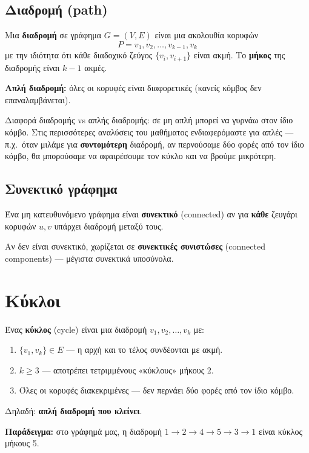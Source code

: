 \documentclass[11pt,a4paper]{article}
\begin{document}
\subsection{Διαδρομή (path)}

Μια \textbf{διαδρομή} σε γράφημα $G = (V, E)$ είναι μια ακολουθία κορυφών
\[
P = v_1, v_2, \dots, v_{k-1}, v_k
\]
με την ιδιότητα ότι κάθε διαδοχικό ζεύγος $\{v_i, v_{i+1}\}$ είναι ακμή. Το
\textbf{μήκος} της διαδρομής είναι $k - 1$ ακμές.

\textbf{Απλή διαδρομή:} όλες οι κορυφές είναι διαφορετικές (κανείς κόμβος δεν
επαναλαμβάνεται).

\begin{intuition}
Διαφορά διαδρομής vs απλής διαδρομής: σε μη απλή μπορεί να γυρνάω στον ίδιο
κόμβο. Στις περισσότερες αναλύσεις του μαθήματος ενδιαφερόμαστε για απλές ---
π.χ.\ όταν μιλάμε για \textbf{συντομότερη} διαδρομή, αν περνούσαμε δύο φορές από
τον ίδιο κόμβο, θα μπορούσαμε να αφαιρέσουμε τον κύκλο και να βρούμε μικρότερη.
\end{intuition}

\subsection{Συνεκτικό γράφημα}

Ένα μη κατευθυνόμενο γράφημα είναι \textbf{συνεκτικό} (connected) αν για
\textbf{κάθε} ζευγάρι κορυφών $u, v$ υπάρχει διαδρομή μεταξύ τους.

Αν δεν είναι συνεκτικό, χωρίζεται σε \textbf{συνεκτικές συνιστώσες} (connected
components) --- μέγιστα συνεκτικά υποσύνολα.

\section{Κύκλοι}

Ένας \textbf{κύκλος} (cycle) είναι μια διαδρομή $v_1, v_2, \dots, v_k$ με:
\begin{enumerate}
  \item $\{v_1, v_k\} \in E$ --- η αρχή και το τέλος συνδέονται με ακμή.
  \item $k \ge 3$ --- αποτρέπει τετριμμένους «κύκλους» μήκους 2.
  \item Όλες οι κορυφές διακεκριμένες --- δεν περνάει δύο φορές από τον ίδιο
  κόμβο.
\end{enumerate}
Δηλαδή: \textbf{απλή διαδρομή που κλείνει}.

\textbf{Παράδειγμα:} στο γράφημά μας, η διαδρομή $1 \to 2 \to 4 \to 5 \to 3 \to
1$ είναι κύκλος μήκους 5.
\end{document}
